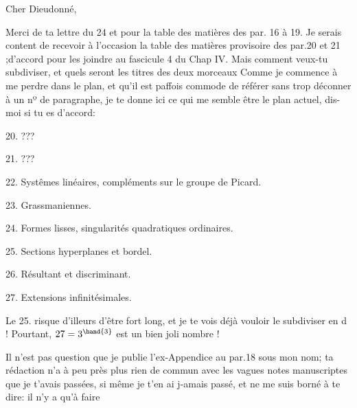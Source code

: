 

Cher Dieudonné,

Merci de ta lettre du 24  et pour la table des matières des par.
16 à 19.  Je serais content de recevoir à l'occasion la table des
matières provisoire des par.20 et 21 ;d'accord pour les joindre au
fascicule 4 du Chap IV. Mais comment veux-tu  subdiviser, et
quels seront les titres des deux morceaux  Comme je commence à me
perdre dans le plan, et qu'il est paffois commode de  référer
sans trop déconner à un nº de paragraphe, je te donne ici ce qui me
semble être le plan actuel, dis-moi si tu es d'accord:

20.  ???

21.  ???

22.  Systêmes linéaires, compléments sur le groupe de Picard.

23.  Grassmaniennes.

24.  Formes lisses, singularités quadratiques ordinaires.

25.  Sections hyperplanes et bordel.

26.  Résultant et discriminant.

27.  Extensions infinitésimales.

Le 25.  risque d'illeurs d'être fort long, et je te vois déjà
vouloir le subdiviser en d !  Pourtant, $27=3^{\hand{3}}$ est un bien joli
nombre !

Il n'est pas question que je publie l'ex-Appendice au par.18
sous mon nom; ta rédaction n'a à peu près plus rien de commun avec
les vagues notes manuscriptes que je t'avais passées, si même je t'en
ai j-amais passé, et ne me suis borné à te dire: il n'y a qu'à faire

